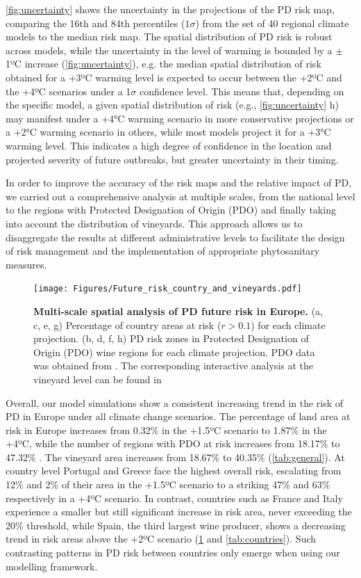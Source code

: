 \cref{fig:uncertainty} shows the uncertainty in the projections of the PD
risk map, comparing the 16th and 84th percentiles ($1\sigma$) from the set of
40 regional climate models to the median risk map. The spatial distribution of
PD risk is robust across models, while the uncertainty in the level of warming
is bounded by a $\pm$ 1ºC increase (\cref{fig:uncertainty}), e.g. the median
spatial distribution of risk obtained for a +3ºC warming level is expected to
occur between the +2ºC and the +4ºC scenarios under a 1$\sigma$ confidence
level. This means that, depending on the specific model, a given spatial
distribution of risk (e.g., \cref{fig:uncertainty} h) may manifest under a +4°C
warming scenario in more conservative projections or a +2°C warming scenario in
others, while most models project it for a +3°C warming level. This indicates a
high degree of confidence in the location and projected severity of future
outbreaks, but greater uncertainty in their timing.

In order to improve the accuracy of the risk maps and the  relative impact
of PD, we carried out a comprehensive analysis at multiple scales, from the
national level to the regions with Protected Designation of Origin (PDO) and
finally taking into account the distribution of vineyards. This approach allows
us to disaggregate the results at different administrative levels to facilitate
the design of risk management and the implementation of appropriate
phytosanitary measures.

\begin{figure}[t!]
    \centering

    \texttt{[image: Figures/Future\_risk\_country\_and\_vineyards.pdf]}
    \caption{\textbf{Multi-scale spatial analysis of PD future risk in
            Europe.} (a, c, e, g) Percentage of country areas at risk ($r>0.1$)
        for each
        climate projection. (b, d, f, h) PD risk zones in Protected Designation
        of
        Origin (PDO) wine regions for each climate projection. PDO data was
        obtained
        from \cite{Candiago2022}. The corresponding interactive analysis at the
        vineyard level can be found in \cite{Webpage}}
    \label{fig:vineyards}
\end{figure}

Overall, our model simulations show a consistent
increasing trend in the risk of PD in Europe under all climate change
scenarios. The percentage of land area at risk in Europe increases from 0.32\%
in the +1.5ºC scenario to 1.87\% in the +4ºC, while the number of regions with
PDO at risk increases from 18.17\% to 47.32\% . The vineyard area  increases
from 18.67\% to 40.35\% (\cref{tab:general}). At country level
Portugal and
Greece face the highest overall risk, escalating from 12\% and 2\% of their
area  in the +1.5ºC scenario to a striking 47\% and 63\%  respectively in a
+4ºC scenario. In contrast, countries such as France and Italy experience a
smaller but still significant increase in risk area, never exceeding the 20\%
threshold, while Spain, the third largest wine producer, shows a decreasing
trend in risk areas above the +2ºC scenario (\cref{fig:vineyards} and
\cref{tab:countries}). Such contrasting patterns in PD risk between
countries
only emerge when using our modelling framework.


